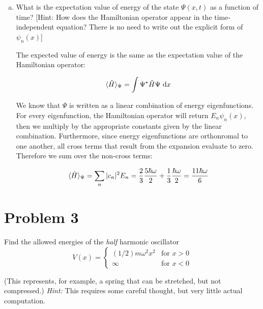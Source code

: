 \documentclass[10pt]{article}
\begin{document}
\begin{enumerate}[(a)]
\begin{solution}
    \end{solution}
    \item What is the expectation value of energy of the state $\Psi(x, t)$ as a function of time? [Hint: How does the Hamiltonian operator appear in the time-independent \schrodinger equation? There is no need to write out the explicit form of $\psi_n(x)$]
    
    \begin{solution}
        The expected value of energy is the same as the expectation value of the Hamiltonian operator:

        \[ \langle \hat H \rangle_{\Psi} = \int \Psi^\star \hat H \Psi \ \mathrm d x\]

        We know that $\Psi$ is written as a linear combination of energy eigenfunctions. For every eigenfunction, the Hamiltonian operator will return $E_n \psi_n(x)$, then we multiply by the appropriate constants given by the linear combination. Furthermore, since energy eigenfunctions are orthonromal to one another, all cross terms that result from the expansion evaluate to zero. Therefore we sum over the non-cross terms:

        \[ \langle \hat H \rangle_{\Psi} = \sum_n |c_n|^2 E_n = \frac23 \frac{5\hbar \omega}{2} + \frac13 \frac{\hbar \omega}{2} = \frac{11\hbar \omega}{6} \]


    \end{solution}
    \end{enumerate}
    

    \pagebreak
    \section*{Problem 3}

    Find the allowed energies of the \textit{half} harmonic oscillator
    \[ 
        V(x) = \begin{cases}
            (1/2) m \omega^2 x^2 & \text{for } x > 0\\
            \infty & \text{for } x < 0
        \end{cases}
        \] 

        (This represents, for example, a spring that can be stretched, but not compressed.) \textit{Hint:} This requires some careful thought, but very little actual computation. 
\end{document}
